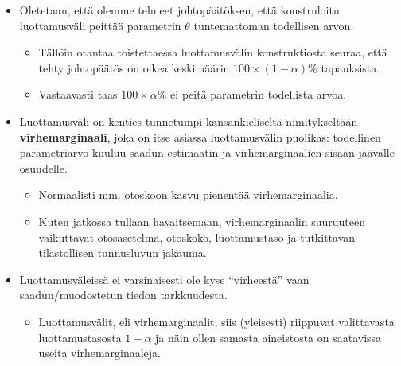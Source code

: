 \documentclass[
]{book}
\providecommand{\tightlist}{%
  \setlength{\itemsep}{0pt}\setlength{\parskip}{0pt}}
\begin{document}
\begin{itemize}
\tightlist
\item
  Oletetaan, että olemme tehneet johtopäätöksen, että konstruloitu luottamusväli peittää parametrin \(\theta\) tuntemattoman todellisen arvon.

  \begin{itemize}
  \tightlist
  \item
    Tällöin otantaa toistettaessa luottamusvälin konstruktiosta seuraa, että tehty johtopäätös on oikea keskimäärin \(100 \times (1-\alpha)\%\) tapauksista.
  \item
    Vastaavasti taas \(100 \times \alpha \%\) ei peitä parametrin todellista arvoa.
  \end{itemize}
\item
  Luottamusväli on kenties tunnetumpi kansankieliseltä nimitykseltään \textbf{virhemarginaali}, joka on itse asiassa luottamusvälin puolikas: todellinen parametriarvo kuuluu saadun estimaatin ja virhemarginaalien sisään jäävälle osuudelle.

  \begin{itemize}
  \tightlist
  \item
    Normaalisti mm. otoskoon kasvu pienentää virhemarginaalia.
  \item
    Kuten jatkossa tullaan havaitsemaan, virhemarginaalin suuruuteen vaikuttavat otosasetelma, otoskoko, luottamustaso ja tutkittavan tilastollisen tunnusluvun jakauma.
  \end{itemize}
\item
  Luottamusväleissä ei varsinaisesti ole kyse ``virheestä'' vaan saadun/muodostetun tiedon tarkkuudesta.

  \begin{itemize}
  \tightlist
  \item
    Luottamusvälit, eli virhemarginaalit, siis (yleisesti) riippuvat valittavasta luottamustasosta \(1-\alpha\) ja näin ollen samasta aineistosta on saatavissa useita virhemarginaaleja.


\end{itemize}
\end{itemize}
\end{document}
